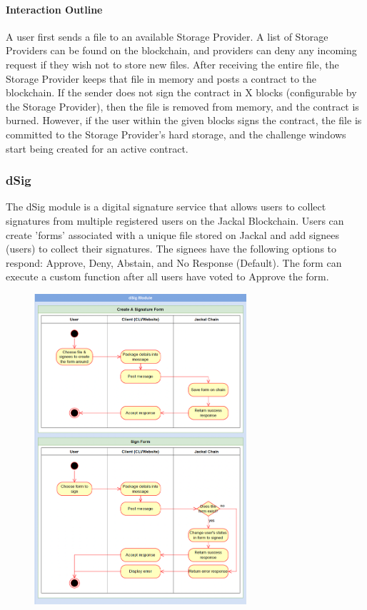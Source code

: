 \documentclass[a4paper]{article}
\begin{document}
\paragraph{Interaction Outline}
A user first sends a file to an available Storage Provider. A list of Storage Providers can be found on the blockchain, and providers can deny any incoming request if they wish not to store new files. After receiving the entire file, the Storage Provider keeps that file in memory and posts a contract to the blockchain. If the sender does not sign the contract in X blocks (configurable by the Storage Provider), then the file is removed from memory, and the contract is burned. However, if the user within the given blocks signs the contract, the file is committed to the Storage Provider's hard storage, and the challenge windows start being created for an active contract.

\newpage
\subsubsection{dSig}
The dSig module is a digital signature service that allows users to collect signatures from multiple registered users on the Jackal Blockchain. Users can create 'forms' associated with a unique file stored on Jackal and add signees (users) to collect their signatures. The signees have the following options to respond: Approve, Deny, Abstain, and No Response (Default). The form can execute a custom function after all users have voted to Approve the form.

\begin{figure}[!htbp]
\centering
\includegraphics[width=0.7\textwidth]{assets/dsig.png}
\end{figure}
\end{document}
